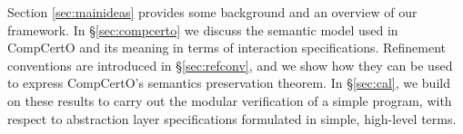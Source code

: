 \documentclass[sigplan,10pt,authordraft]{acmart}
\begin{document}
Section \ref{sec:mainideas}
provides some background and
an overview of our framework.
In \S\ref{sec:compcerto}
we discuss the semantic model used in CompCertO
and its meaning in terms of interaction specifications.
Refinement conventions are introduced in \S\ref{sec:refconv},
and we show how they can be used to express
CompCertO's semantics preservation theorem.
In \S\ref{sec:cal},
we build on these results
to carry out the modular verification of
a simple program,
with respect to abstraction layer specifications
formulated in simple, high-level terms.

%
%
%
%
%
%
%
%
\end{document}
